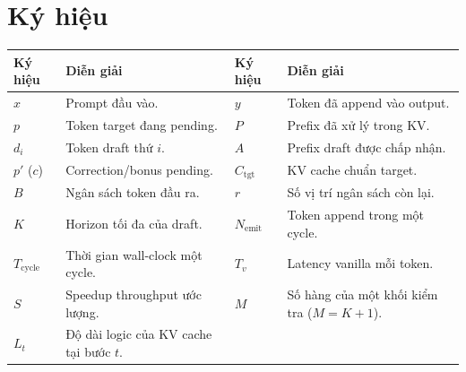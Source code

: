 \section*{Ký hiệu}
\small
\begin{longtable}{@{}l p{} l p{}@{}}
\toprule
\textbf{Ký hiệu} & \textbf{Diễn giải} & \textbf{Ký hiệu} & \textbf{Diễn giải} \\
\midrule
$x$ & Prompt đầu vào. & $y$ & Token đã append vào output. \\
$p$ & Token target đang pending. & $P$ & Prefix đã xử lý trong KV. \\
$d_i$ & Token draft thứ $i$. & $A$ & Prefix draft được chấp nhận. \\
$p'$ ($c$) & Correction/bonus pending. & $C_{\mathrm{tgt}}$ & KV cache chuẩn target. \\
$B$ & Ngân sách token đầu ra. & $r$ & Số vị trí ngân sách còn lại. \\
$K$ & Horizon tối đa của draft. & $N_{\mathrm{emit}}$ & Token append trong một cycle. \\
$T_{\mathrm{cycle}}$ & Thời gian wall-clock một cycle. & $T_v$ & Latency vanilla mỗi token. \\
$S$ & Speedup throughput ước lượng. & $M$ & Số hàng của một khối kiểm tra ($M=K+1$). \\
$L_t$ & Độ dài logic của KV cache tại bước $t$. & & \\
\bottomrule
\end{longtable}
\normalsize
